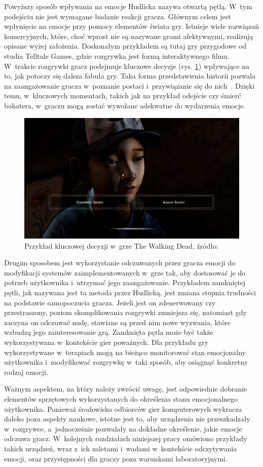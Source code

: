 Powyższy sposób wpływania na emocje Hudlicka nazywa otwartą pętlą. W~tym podejściu nie jest wymagane badanie reakcji gracza. Głównym celem jest wpłynięcie na emocje przy pomocy elementów świata gry. Istnieje wiele rozwiązań komercyjnych, które, choć wprost nie są nazywane grami afektywnymi, realizują opisane wyżej założenia. Doskonałym przykładem są tutaj gry przygodowe od studia Telltale Games, gdzie rozgrywka jest formą interaktywnego filmu. W~trakcie rozgrywki gracz podejmuje kluczowe decyzje (rys. \ref{fig:walking_dead}) wpływające na to, jak potoczy się dalsza fabuła gry. Taka forma przedstawienia historii pozwala na zaangażowanie gracza w~poznanie postaci i~przywiązanie się do nich~\cite{games_for_empathy}. Dzięki temu, w~kluczowych momentach, takich jak na przykład odejście czy śmierć bohatera, w~graczu mogą zostać wywołane adekwatne do wydarzenia emocje.
\begin{figure}
	\centering
	\includegraphics[width=0.7\linewidth]{images/walking_dead_decision.jpg}
	\caption{Przykład kluczowej decyzji w~grze The Walking Dead, źródło:~\cite{the_walking_dead}}
	\label{fig:walking_dead}
\end{figure}

Drugim sposobem jest wykorzystanie odczuwanych przez gracza emocji do modyfikacji systemów zaimplementowanych w~grze tak, aby dostosować je do potrzeb użytkownika i~utrzymać jego zaangażowanie. Przykładem zamkniętej pętli, jak nazywana jest ta metoda przez Hudlicką, jest zmiana stopnia trudności na podstawie samopoczucia gracza. Jeżeli jest on zdenerwowany czy przestraszony, poziom skomplikowania rozgrywki zmniejsza się, natomiast gdy zaczyna on odczuwać nudę, stawiane są przed nim nowe wyzwania, które wzbudzą jego zainteresowanie grą. Zamknięta pętla może być także wykorzystywana w~kontekście gier poważnych. Dla przykładu gry wykorzystywane w~terapiach mogą na bieżąco monitorować stan emocjonalny użytkownika i~modyfikować rozgrywkę w~taki sposób, aby osiągnąć konkretny rodzaj emocji.

Ważnym aspektem, na który należy zwrócić uwagę, jest odpowiednie dobranie elementów sprzętowych wykorzystanych do określenia stanu emocjonalnego użytkownika. Ponieważ środowisko odbiorców gier komputerowych wykracza daleko poza aspekty naukowe, istotne jest to, aby urządzenia nie przeszkadzały w~rozgrywce, a~jednocześnie pozwalały na dokładne określenie, jakie emocje odczuwa gracz. W~kolejnych rozdziałach niniejszej pracy omówiono przykłady takich urządzeń, wraz z~ich zaletami i~wadami w~kontekście odczytywania emocji, oraz przystępności dla graczy poza warunkami laboratoryjnymi.

